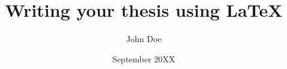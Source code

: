 \documentclass{Dissertation}
\begin{document}
\title{Writing your thesis using \LaTeX}
\date{September 20XX}
\author{John Doe}
\maketitle
% 

\frontmatter
\tableofcontents
\listoffigures
\listoftables

\mainmatter



\backmatter




\end{document}
